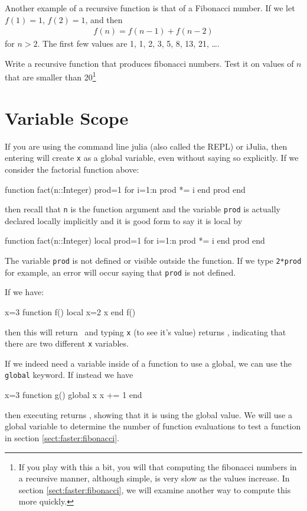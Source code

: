 Another example of a recursive function is that of a Fibonacci number. If we let $f(1)=1$, $f(2)=1$, and then 
%
\begin{align*}
f(n)=f(n-1)+f(n-2)
\end{align*} 
%
for $n>2$. The first few values are 1, 1, 2, 3, 5, 8, 13, 21, \ldots. 

Write a recursive function that produces fibonacci numbers. Test it on values of $n$ that are smaller than 20\footnote{If you play with this a bit, you will that computing the fibonacci numbers in a recursive manner, although simple, is very slow as the values increase.  In section \ref{sect:faster:fibonacci}, we will examine another way to compute this more quickly.}


\section{Variable Scope}

If you are using the command line julia (also called the REPL) or
iJulia, then entering  will create \texttt{x} as a global variable, even without saying so
explicitly. If we consider the factorial function above:

\begin{jlblock}[functions]
function fact(n::Integer)
  prod=1
  for i=1:n
    prod *= i
  end
  prod
end
\end{jlblock}
%
then recall that \texttt{n} is the function argument and the variable
\texttt{prod} is actually declared locally implicitly and it is good
form to say it is local by

\begin{jlblock}[functions]
function fact(n::Integer)
  local prod=1
  for i=1:n
    prod *= i
  end
  prod
end
\end{jlblock}

The variable \texttt{prod} is not defined or visible outside the
function. If we type \texttt{2*prod} for example, an error will occur
saying that \texttt{prod} is not defined.

If we have:

\begin{jlblock}[functions]
x=3
function f()
  local x=2
  x
end
f()
\end{jlblock}
%
then this will return \printpythontex[verb]~and typing \texttt{x} (to see it's value) returns \printpythontex[verb], indicating that there are two different \texttt{x} variables.

If we indeed need a variable inside of a function to use a global, we can use the \texttt{global} keyword.  If instead we have
\begin{jlblock}[functions]
x=3
function g()
  global x
  x += 1
end
\end{jlblock}
then executing  returns  \printpythontex[verb], showing that it is using the global value.  We will use a global variable to determine the number of function evaluations to test a function in section \ref{sect:faster:fibonacci}. 
